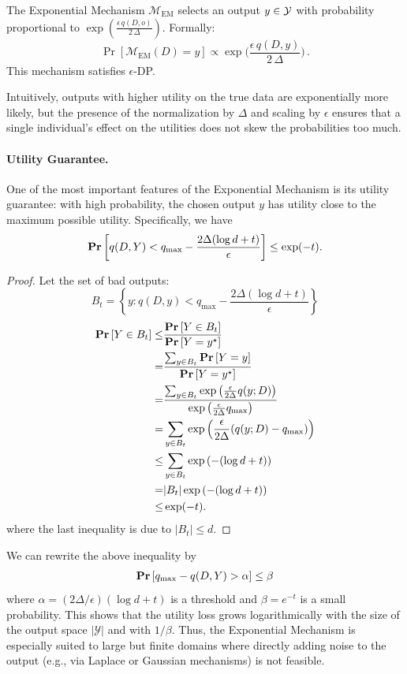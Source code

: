 \documentclass[11pt, a4paper]{article}
\begin{document}
The Exponential Mechanism $\mathcal{M}_\text{EM}$ selects an output $y \in {\cal Y}$ with probability proportional to $\exp\!\left(\frac{\epsilon\, q(D,o)}{2\,\Delta}\right)$.
Formally:
\[ 
    \Pr[\mathcal{M}_\text{EM}(D) = y] \propto \exp\!\Big(\frac{\epsilon\, q(D,y)}{2\,\Delta}\Big)\,. 
\] 
This mechanism satisfies $\epsilon$-DP.

Intuitively, outputs with higher utility on the true data are exponentially more likely,
but the presence of the normalization by $\Delta$ and scaling by $\epsilon$ ensures that 
a single individual's effect on the utilities does not skew the probabilities too much.

\paragraph{Utility Guarantee.}
One of the most important features of the Exponential Mechanism is its utility guarantee:
with high probability, the chosen output $y$ has utility close to the maximum possible utility.
Specifically, we have
\[
    \Prob{q(D, Y) < q_{\max} - \frac{2 \Delta (\log d + t)}{\epsilon}} \leq \exp(-t).
\]
\begin{proof}
Let the set of bad outputs:
\[
    B_t = \left\{y: q(D, y) < q_{\max} - \frac{2 \Delta (\log d + t)}{\epsilon}\right\}
\]
\begin{align}
    \Prob{Y\in B_t} 
    \leq& \frac{\Prob{Y\in B_t}}{\Prob{Y=y^\star}}\\
    =& \frac{\sum_{y\in B_t} \Prob{Y=y}}{\Prob{Y=y^\star}}\\
    =& \frac{\sum_{y\in B_t}\exp\left(\frac{\epsilon}{2\Delta}q(y;D)\right)}
        {\exp\left(\frac{\epsilon}{2\Delta}q_{\max}\right)}\\
    =& \sum_{y\in B_t}\exp\left(\frac{\epsilon}{2\Delta}(q(y;D)-q_{\max})\right)\\
    \leq& \sum_{y\in B_t}\exp\left(-(\log d + t)\right)\\
    =& |B_t| \exp\left(-(\log d + t)\right)\\
    \leq& \exp(-t).
\end{align}
where the last inequality is due to $|B_t|\leq d$.
\end{proof}

We can rewrite the above inequality by
\begin{align}
    \Prob{q_{\max} - q(D, Y) > \alpha } \leq \beta
\end{align}
where $\alpha= (2\Delta/\epsilon)(\log d + t)$ is a threshold and $\beta = e^{-t}$ is a small probability.
This shows that the utility loss grows logarithmically with the size of the output space $|\mathcal{Y}|$ and with $1/\beta$.
Thus, the Exponential Mechanism is especially suited to large but finite domains where directly adding noise to the output (e.g., via Laplace or Gaussian mechanisms) is not feasible.
\end{document}
